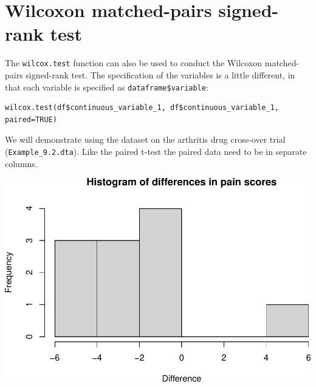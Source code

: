 \documentclass[
]{memoir}
\newenvironment{Shaded}{\begin{snugshade}}{\end{snugshade}}
\newcommand{\AttributeTok}[1]{\textcolor[rgb]{0.77,0.63,0.00}{#1}}
\newcommand{\FunctionTok}[1]{\textcolor[rgb]{0.00,0.00,0.00}{#1}}
\newcommand{\NormalTok}[1]{#1}
\newcommand{\OtherTok}[1]{\textcolor[rgb]{0.56,0.35,0.01}{#1}}
\newcommand{\SpecialCharTok}[1]{\textcolor[rgb]{0.00,0.00,0.00}{#1}}
\newcommand{\StringTok}[1]{\textcolor[rgb]{0.31,0.60,0.02}{#1}}
\begin{document}
\hypertarget{wilcoxon-matched-pairs-signed-rank-test}{%
\section{Wilcoxon matched-pairs signed-rank test}\label{wilcoxon-matched-pairs-signed-rank-test}}

The \texttt{wilcox.test} function can also be used to conduct the Wilcoxon matched-pairs signed-rank test. The specification of the variables is a little different, in that each variable is specified as \texttt{dataframe\$variable}:

\begin{verbatim}
wilcox.test(df$continuous_variable_1, df$continuous_variable_1, paired=TRUE)
\end{verbatim}

We will demonstrate using the dataset on the arthritis drug cross-over trial (\texttt{Example\_9.2.dta}). Like the paired t-test the paired data need to be in separate columns.

\begin{Shaded}
\end{Shaded}

\includegraphics{09.1-non-normal-R_files/figure-latex/unnamed-chunk-5-1.pdf}
\end{document}
